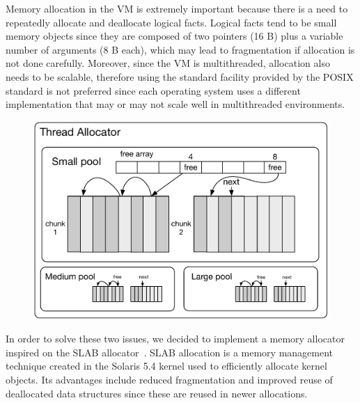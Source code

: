 
Memory allocation in the VM is extremely important because there is a need to
repeatedly allocate and deallocate logical facts. Logical facts tend to be small
memory objects since they are composed of two pointers (16 B) plus a variable
number of arguments (8 B each), which may lead to fragmentation if allocation is
not done carefully.  Moreover, since the VM is multithreaded, allocation also
needs to be scalable, therefore using the standard  facility
provided by the POSIX standard is not preferred since each operating system uses
a different implementation that may or may not scale well in multithreaded
environments.

\begin{figure}[ht]
   \begin{center}
      \includegraphics[width=0.7\linewidth]{figures/implementation/pool.pdf}
   \end{center}


   \label{fig:implementation:pool}
\end{figure}

In order to solve these two issues, we decided to implement a memory allocator
inspired on the SLAB allocator~\cite{Bonwick-94}. SLAB allocation is a memory
management technique created in the Solaris 5.4 kernel used to efficiently
allocate kernel objects. Its advantages include reduced fragmentation and
improved reuse of deallocated data structures since these are reused in newer
allocations.

